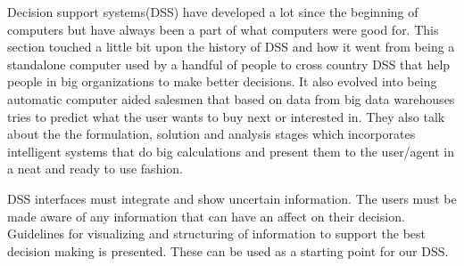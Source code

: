 Decision support systems(DSS) have developed a lot since the beginning of computers but have always been a part of what computers were good for. This section touched a little bit upon the history of DSS and how it went from being a standalone computer used by a handful of people to cross country DSS that help people in big organizations to make better decisions. It also evolved into being automatic computer aided salesmen that based on data from big data warehouses tries to predict what the user wants to buy next or interested in. They also talk about the the formulation, solution and analysis stages which incorporates intelligent systems that do big calculations and present them to the user/agent in a neat and ready to use fashion.

DSS interfaces must integrate and show uncertain information. The users must be made aware of any information that can have an affect on their decision. Guidelines for visualizing and structuring of information to support the best decision making is presented. These can be used as a starting point for our DSS.
